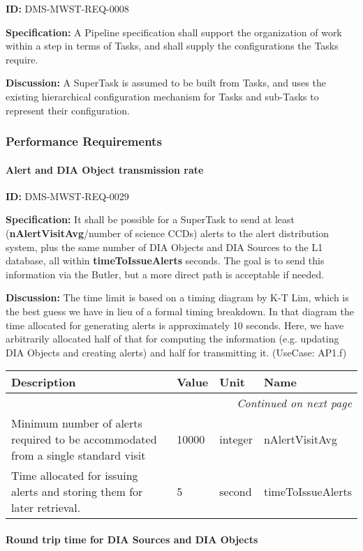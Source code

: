 \documentclass[SE,toc,lsstdraft]{lsstdoc}
\makeatletter
\newcommand{\paramname}[1]{\hspace{0pt}#1}
\newcommand{\unitname}[1]{\hspace{0pt}#1}
\newenvironment{parameters}[0]{%
\setlength\LTleft{0pt}
\setlength\LTright{\fill}
\begin{small}
\begin{longtable}[]{|p{0.49\textwidth}|l|p{0.6in}|p{1.70in}@{}|}

\hline \textbf{Description} & \textbf{Value} & \textbf{Unit} & \textbf{Name} \\ \hline
\endhead

\hline \multicolumn{4}{r}{\emph{Continued on next page}} \\
\endfoot

\hline\hline
\endlastfoot
}{%
\hline
\end{longtable}
\end{small}
}
\makeatother
\begin{document}
\label{DMS-MWST-REQ-0008}
\textbf{ID:} DMS-MWST-REQ-0008

\textbf{Specification:}
A Pipeline specification shall support the organization of work within a step in terms of Tasks, and shall supply the configurations the Tasks require.

\textbf{Discussion:}
A SuperTask is assumed to be built from Tasks, and uses the existing hierarchical configuration mechanism for Tasks and sub-Tasks to represent their configuration.

\subsubsection{Performance Requirements}

\paragraph{Alert and DIA Object transmission rate}\hfill  %

\label{DMS-MWST-REQ-0029}
\textbf{ID:} DMS-MWST-REQ-0029

\textbf{Specification:}
It shall be possible for a SuperTask to send at least (\textbf{nAlertVisitAvg}/number of science CCDs) alerts to the alert distribution system, plus the same number of DIA Objects and DIA Sources to the L1 database, all within \textbf{timeToIssueAlerts} seconds. The goal is to send this information via the Butler, but a more direct path is acceptable if needed.

\textbf{Discussion:}
The time limit is based on a timing diagram by K-T Lim, which is the best guess we have in lieu of a formal timing breakdown. In that diagram the time allocated for generating alerts is approximately 10 seconds. Here, we have arbitrarily allocated half of that for computing the information (e.g. updating DIA Objects and creating alerts) and half for transmitting it. (UseCase: AP1.f)

\begin{parameters}
Minimum number of alerts required to be accommodated from a single standard visit
&
10000
&
\unitname{%
integer
}
&
\paramname{%
nAlertVisitAvg
} \\\hline
Time allocated for issuing alerts and storing them for later retrieval.
&
5
&
\unitname{%
second
}
&
\paramname{%
timeToIssueAlerts
} \\\hline
\end{parameters}

\paragraph{Round trip time for DIA Sources and DIA Objects}\hfill  %
\end{document}
